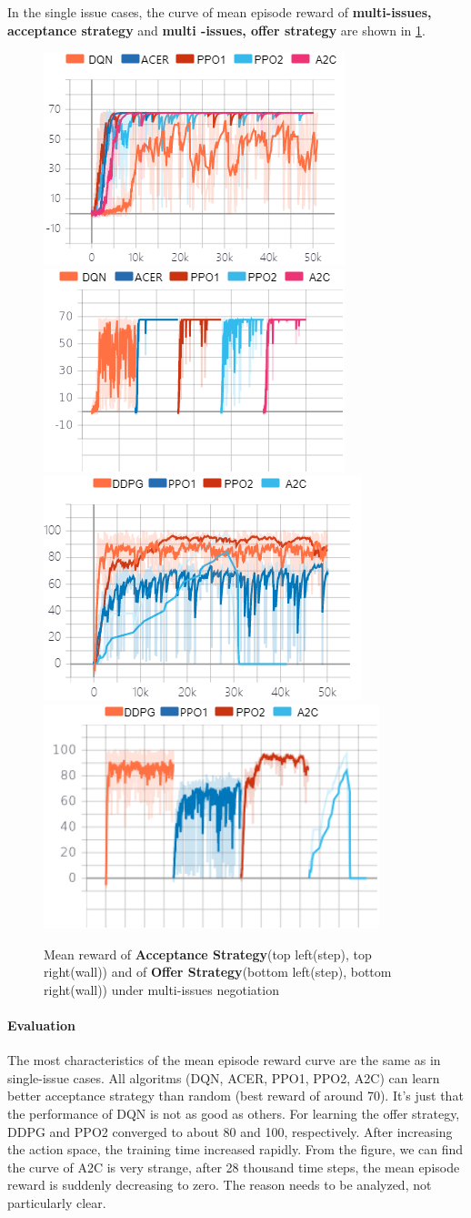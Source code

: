In the single issue cases, the curve of mean episode reward of \textbf{multi-issues, acceptance strategy} and \textbf{multi -issues, offer strategy} are shown in \ref{fig:multi-issues}. 
\begin{figure}
    \includegraphics[width=.40\textwidth]{./images/ac_s_multi_issues.png}\hfill
    \includegraphics[width=.40\textwidth]{./images/ac_s_multi_issues_wall.png}
    \\[\smallskipamount]
    \includegraphics[width=.40\textwidth]{./images/of_s_multi_issues.png}\hfill
    \includegraphics[width=.40\textwidth]{./images/of_s_multi_issues_wall.png}
    \caption{Mean reward of \textbf{Acceptance Strategy}(top left(step), top right(wall)) and of \textbf{Offer Strategy}(bottom left(step), bottom right(wall)) under multi-issues negotiation}
		\label{fig:multi-issues}
\end{figure}

\paragraph{Evaluation} The most characteristics of the mean episode reward curve are the same as in single-issue cases. All algoritms (DQN, ACER, PPO1, PPO2, A2C) can learn better acceptance strategy than random (best reward of around 70). It's just that the performance of DQN is not as good as others. For learning the offer strategy, DDPG and PPO2 converged to about 80 and 100, respectively. After increasing the action space, the training time increased rapidly. From the figure, we can find the curve of A2C is very strange, after 28 thousand time steps, the mean episode reward is suddenly decreasing to zero. The reason needs to be analyzed, not particularly clear.

